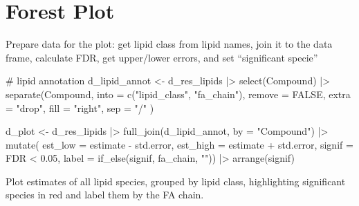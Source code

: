 \documentclass[
  letterpaper,
  DIV=11,
  numbers=noendperiod]{scrreprt}
\newenvironment{Shaded}{\begin{snugshade}}{\end{snugshade}}
\newcommand{\AttributeTok}[1]{\textcolor[rgb]{0.40,0.45,0.13}{#1}}
\newcommand{\CommentTok}[1]{\textcolor[rgb]{0.37,0.37,0.37}{#1}}
\newcommand{\ConstantTok}[1]{\textcolor[rgb]{0.56,0.35,0.01}{#1}}
\newcommand{\FloatTok}[1]{\textcolor[rgb]{0.68,0.00,0.00}{#1}}
\newcommand{\FunctionTok}[1]{\textcolor[rgb]{0.28,0.35,0.67}{#1}}
\newcommand{\NormalTok}[1]{\textcolor[rgb]{0.00,0.23,0.31}{#1}}
\newcommand{\OtherTok}[1]{\textcolor[rgb]{0.00,0.23,0.31}{#1}}
\newcommand{\SpecialCharTok}[1]{\textcolor[rgb]{0.37,0.37,0.37}{#1}}
\newcommand{\StringTok}[1]{\textcolor[rgb]{0.13,0.47,0.30}{#1}}
\begin{document}
\hypertarget{forest-plot}{%
\section{Forest Plot}\label{forest-plot}}

Prepare data for the plot: get lipid class from lipid names, join it to
the data frame, calculate FDR, get upper/lower errors, and set
``significant specie''

\begin{Shaded}
\begin{Highlighting}[]
\CommentTok{\# lipid annotation}
\NormalTok{d\_lipid\_annot }\OtherTok{\textless{}{-}}\NormalTok{ d\_res\_lipids }\SpecialCharTok{|\textgreater{}}
  \FunctionTok{select}\NormalTok{(Compound) }\SpecialCharTok{|\textgreater{}}  
  \FunctionTok{separate}\NormalTok{(Compound, }
           \AttributeTok{into =} \FunctionTok{c}\NormalTok{(}\StringTok{"lipid\_class"}\NormalTok{, }\StringTok{"fa\_chain"}\NormalTok{), }
           \AttributeTok{remove =} \ConstantTok{FALSE}\NormalTok{, }
           \AttributeTok{extra =} \StringTok{"drop"}\NormalTok{,}
           \AttributeTok{fill =} \StringTok{"right"}\NormalTok{,  }
           \AttributeTok{sep =} \StringTok{"/"}\NormalTok{ )}

\NormalTok{d\_plot }\OtherTok{\textless{}{-}}\NormalTok{ d\_res\_lipids }\SpecialCharTok{|\textgreater{}} 
  \FunctionTok{full\_join}\NormalTok{(d\_lipid\_annot, }\AttributeTok{by =} \StringTok{"Compound"}\NormalTok{) }\SpecialCharTok{|\textgreater{}} 
  \FunctionTok{mutate}\NormalTok{(}
    \AttributeTok{est\_low =}\NormalTok{ estimate }\SpecialCharTok{{-}}\NormalTok{ std.error,}
    \AttributeTok{est\_high =}\NormalTok{ estimate }\SpecialCharTok{+}\NormalTok{ std.error, }
    \AttributeTok{signif =}\NormalTok{ FDR }\SpecialCharTok{\textless{}} \FloatTok{0.05}\NormalTok{,}
    \AttributeTok{label =} \FunctionTok{if\_else}\NormalTok{(signif, fa\_chain, }\StringTok{""}\NormalTok{)) }\SpecialCharTok{|\textgreater{}} 
  \FunctionTok{arrange}\NormalTok{(signif)}
\end{Highlighting}
\end{Shaded}

Plot estimates of all lipid species, grouped by lipid class,
highlighting significant species in red and label them by the FA chain.
\end{document}
